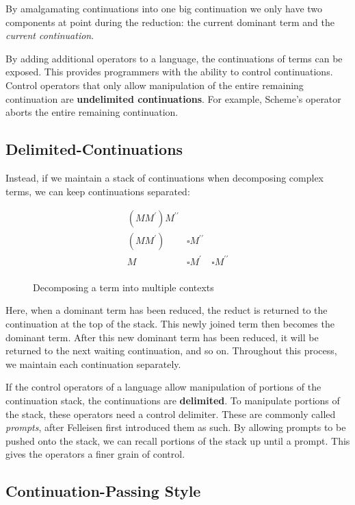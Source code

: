   By amalgamating continuations into one big continuation we only have
  two components at point during the reduction: the current dominant term
  and the \emph{current continuation}. 
 
  By adding additional operators to a language, the continuations of terms can be exposed.
  This provides programmers with the ability to control continuations.
  Control operators that only allow manipulation of the entire remaining continuation are \textbf{undelimited continuations}. 
  For example, Scheme's  operator aborts the entire remaining continuation.

  \subsection{Delimited-Continuations}

  Instead, if we maintain a stack of continuations when
  decomposing complex terms, we can keep continuations separated:
  
  \begin{figure}[!h]
    \[
    \begin{array}{lll}
      (MM^\prime) M^{\prime\prime} \\
      (MM^\prime) & \square M^{\prime\prime} \\
      M & \square M^\prime & \square M^{\prime\prime} \\
    \end{array}
    \]
  \caption{Decomposing a term into multiple contexts}
  \end{figure}

  Here, when a dominant term has been reduced, 
  the reduct is returned to the continuation at the top of the stack. 
  This newly joined term then becomes the dominant term. 
  After this new dominant term has been reduced, 
  it will be returned to the next waiting continuation, and so on. 
  Throughout this process, we maintain each continuation separately.

  If the control operators of a language allow manipulation of portions of the continuation stack,
  the continuations are \textbf{delimited}.
  To manipulate portions of the stack, these operators need a control delimiter.
  These are commonly called \emph{prompts}, after Felleisen first introduced them as such.
  By allowing prompts to be pushed onto the stack, we can recall portions of the stack up until a prompt.
  This gives the operators a finer grain of control.

  \subsection{Continuation-Passing Style}
 
